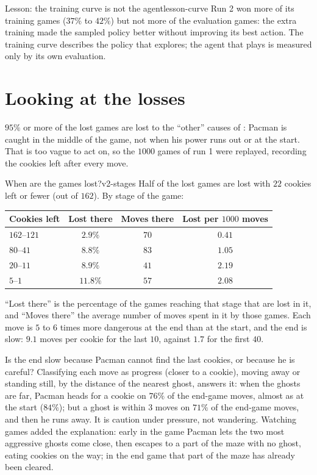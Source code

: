 \begin{remark}{Lesson: the training curve is not the agent}{lesson-curve}
  Run 2 won more of its training games ($37\%$ to $42\%$) but not more of
  the evaluation games: the extra training made the sampled policy better
  without improving its best action. The training curve describes the
  policy that explores; the agent that plays is measured only by its own
  evaluation.
\end{remark}

\section{Looking at the losses}
\label{sec:v2-losses}

$95\%$ or more of the lost games are lost to the ``other'' causes of
: Pacman is caught in the middle of the game, not when
his power runs out or at the start. That is too vague to act on, so the
$1000$ games of run 1 were replayed, recording the cookies left after every
move.

\begin{pacman}{When are the games lost?}{v2-stages}
  Half of the lost games are lost with $22$ cookies left or fewer (out of
  $162$). By stage of the game:
  \begin{center}
    \begin{tabular}{@{}lccc@{}}
      \toprule
      Cookies left & Lost there & Moves there & Lost per $1000$
        moves \\
      \midrule
      $162$--$121$ & $2.9\%$ & $70$ & $0.41$ \\
      $80$--$41$ & $8.8\%$ & $83$ & $1.05$ \\
      $20$--$11$ & $8.9\%$ & $41$ & $2.19$ \\
      $5$--$1$ & $11.8\%$ & $57$ & $2.08$ \\
      \bottomrule
    \end{tabular}
  \end{center}
  ``Lost there'' is the percentage of the games reaching that stage that
  are lost in it, and ``Moves there'' the average number of moves spent in
  it by those games. Each move is $5$ to $6$ times more dangerous at the end
  than at the start, and the end is slow: $9.1$ moves per cookie for the
  last $10$, against $1.7$ for the first $40$.
\end{pacman}

Is the end slow because Pacman cannot find the last cookies, or because he
is careful? Classifying each move as progress (closer to a cookie),
moving away or standing still, by the distance of the nearest ghost,
answers it: when the ghosts are far, Pacman heads for a cookie on $76\%$ of
the end-game moves, almost as at the start ($84\%$); but a ghost is within
$3$ moves on $71\%$ of the end-game moves, and then he runs away. It is
caution under pressure, not wandering. Watching games added the
explanation: early in the game Pacman lets the two most aggressive ghosts
come close, then escapes to a part of the maze with no ghost, eating
cookies on the way; in the end game that part of the maze has already been
cleared.

